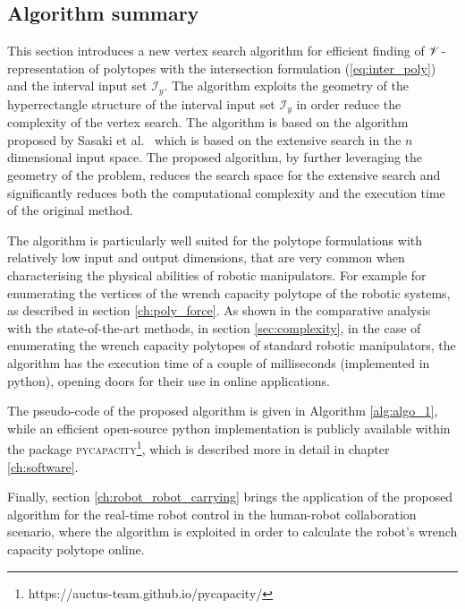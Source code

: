 \subsection{Algorithm summary}
This section introduces a new vertex search algorithm for efficient finding of $\mathscr{V}$-representation of polytopes with the intersection formulation (\ref{eq:inter_poly}) and the interval input set $\mathcal{I}_y$. The algorithm exploits the geometry of the hyperrectangle structure of the interval input set $\mathcal{I}_y$ in order reduce the complexity of the vertex search. The algorithm is based on the algorithm proposed by Sasaki et al.~\cite{sasaki2011vertex} which is based on the extensive search in the $n$ dimensional input space. The proposed algorithm, by further leveraging the geometry of the problem, reduces the search space for the extensive search and significantly reduces both the computational complexity and the execution time of the original method.

The algorithm is particularly well suited for the polytope formulations with relatively low input and output dimensions, that are very common when characterising the physical abilities of robotic manipulators. For example for enumerating the vertices of the wrench capacity polytope of the robotic systems, as described in section \ref{ch:poly_force}. As shown in the comparative analysis with the state-of-the-art methods, in section \ref{sec:complexity},  in the case of enumerating the wrench capacity polytopes of standard robotic manipulators, the algorithm has the execution time of a couple of milliseconds (implemented in python), opening doors for their use in online applications.

The pseudo-code of the proposed algorithm is given in Algorithm \ref{alg:algo_1}, while an efficient open-source python implementation is publicly available within the package \textsc{pycapacity}\footnote{https://auctus-team.github.io/pycapacity/}, which is described more in detail in chapter \ref{ch:software}.

Finally, section \ref{ch:robot_robot_carrying} brings the application of the proposed algorithm for the real-time robot control in the human-robot collaboration scenario, where the algorithm is exploited in order to calculate the robot's wrench capacity polytope online. 


